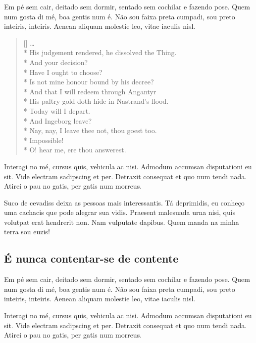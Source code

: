 Em pé sem cair, deitado sem dormir, sentado sem cochilar e fazendo pose. Quem
num gosta di mé, boa gentis num é. Não sou faixa preta cumpadi, sou preto
inteiris, inteiris. Aenean aliquam molestie leo, vitae iaculis nisl.

\settowidth{\versewidth}{Nay, nay, I leave thee not, thou goest too}
\begin{verse}[\versewidth]
\ldots \\*
His judgement rendered, he dissolved the Thing. \\*
 And your decision? \\*
 
Have I ought to choose? \\*
Is not mine honour bound by his decree? \\*
And that I will redeem through Angantyr \\*
His paltry gold doth hide in Nastrand’s flood. \\*
Today will I depart. \\*
 
And Ingeborg leave? \\*
 Nay, nay, I leave thee not,
thou goest too. \\*
 Impossible! \\*
 
O! hear me, ere thou answerest.
\end{verse}

Interagi no mé, cursus quis, vehicula ac nisi. Admodum accumsan disputationi eu
sit. Vide electram sadipscing et per. Detraxit consequat et quo num tendi nada.
Atirei o pau no gatis, per gatis num morreus.

Suco de cevadiss deixa as pessoas mais interessantis. Tá deprimidis, eu conheço
uma cachacis que pode alegrar sua vidis. Praesent malesuada urna nisi, quis
volutpat erat hendrerit non. Nam vulputate dapibus. Quem manda na minha terra
sou euzis!

\subsection{É nunca contentar-se de contente}


Em pé sem cair, deitado sem dormir, sentado sem cochilar e fazendo pose. Quem
num gosta di mé, boa gentis num é. Não sou faixa preta cumpadi, sou preto
inteiris, inteiris. Aenean aliquam molestie leo, vitae iaculis nisl.

Interagi no mé, cursus quis, vehicula ac nisi. Admodum accumsan disputationi eu
sit. Vide electram sadipscing et per. Detraxit consequat et quo num tendi nada.
Atirei o pau no gatis, per gatis num morreus.

